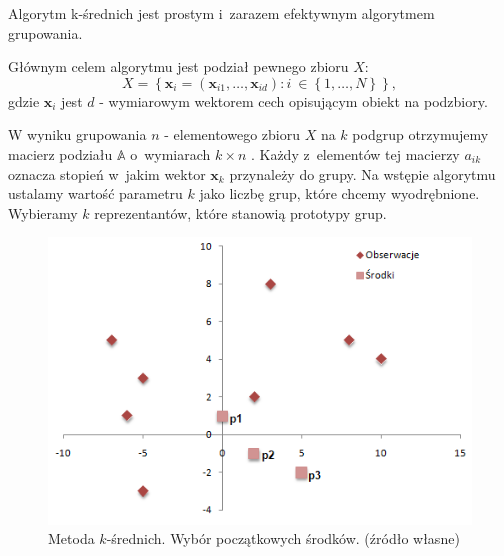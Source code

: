 \documentclass[12pt,a4paper]{report}
\newcommand{\set}[1]{\left\lbrace {#1} \right\rbrace}
\begin{document}
Algorytm k-średnich jest prostym i~zarazem efektywnym algorytmem grupowania.

Głównym celem algorytmu jest podział pewnego zbioru $\mathit{X}$:
$$
\mathit{X} = \set{\mathbf{x}_i = (\mathbf{x}_{i1},\ldots,\mathbf{x}_{id}) : i~\in \set{1,\ldots,N}},
$$
gdzie $\mathbf{x}_i$ jest $d$ - wymiarowym wektorem cech opisującym obiekt na podzbiory.

W wyniku grupowania $n$ - elementowego zbioru $\mathit{X}$ na $k$ podgrup otrzymujemy macierz podziału $\mathbb{A}$ o~wymiarach $k\times n$ . Każdy z~elementów tej macierzy $a_{ik}$ oznacza stopień w~jakim wektor $\mathbf{x}_k$ przynależy do grupy. Na wstępie algorytmu ustalamy wartość parametru $k$ jako liczbę grup, które chcemy wyodrębnione. Wybieramy $k$ reprezentantów, które stanowią prototypy grup.
\begin{center}
\begin{figure}[H]
\centering
\includegraphics[scale=0.8]{obrazy/ks_0.PNG} 
\caption{Metoda $k$-średnich. Wybór początkowych środków. (źródło własne)}
\end{figure}
\end{center}
\end{document}
